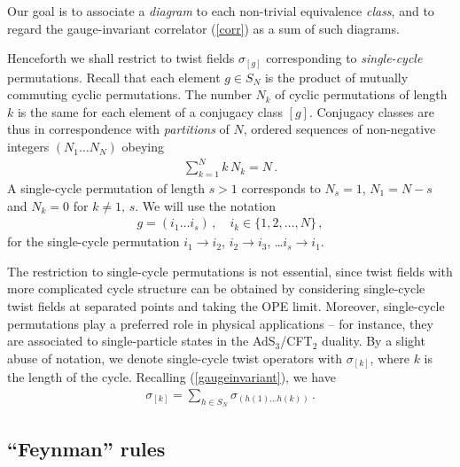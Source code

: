 \documentclass[letterpaper]{JHEP3}
\def\be{\begin{equation}}
\def\ee{\end{equation}}
\def\be{\begin{eqnarray}}
\def\ee{\end{eqnarray}}
\begin{document}
Our goal is to associate a {\it diagram} to each non-trivial equivalence {\it class},
and to regard the  gauge-invariant correlator (\ref{corr}) as a sum of such diagrams.



Henceforth we shall restrict to   twist fields $\sigma_{[g]}$
corresponding to {\it single-cycle} permutations. Recall that
 each element $g \in S_N$ is the   product of mutually commuting cyclic permutations. The number $N_k$
 of cyclic permutations of length $k$ is the same for each element
 of a  conjugacy class $[g]$. Conjugacy classes are thus in correspondence with
 {\it partitions}  of $N$, ordered sequences 
 of non-negative integers $(N_1 \dots N_N )$ obeying
 \be
 \sum_{k=1}^N k \, N_k = N \,.
 \ee
A single-cycle  permutation of length $s >1$ corresponds to $N_s = 1$, $N_1 =N-s$ and 
$N_k = 0$ for $k \neq 1,\, s$.  We will use the notation
\be
g = (i_1 \dots i_s) \, ,  \quad i_k \in \{1, 2, \dots, N \} \, ,
\ee
for the single-cycle permutation $i_1 \to i_2$, $i_2 \to i_3$, \dots $i_s \to i_1$.


The restriction to single-cycle permutations is not essential,  since
twist fields with more complicated cycle structure can be obtained by considering single-cycle twist fields at separated
points and taking the OPE limit.  Moreover, single-cycle permutations play a preferred
role in physical applications -- for instance, they are associated to single-particle
states in the AdS$_3$/CFT$_2$ duality. By a slight abuse of notation, we denote
single-cycle twist operators with $\sigma_{[k]}$, where $k$ is the length of the cycle.
Recalling (\ref{gaugeinvariant}), we have 
\be
\sigma_{[k]} = \sum_{h \in S_N}     \sigma_{  ( h(1)   \dots h(k) )} \,.
\ee


\subsection{``Feynman'' rules}  \label{diagconst}
\end{document}
